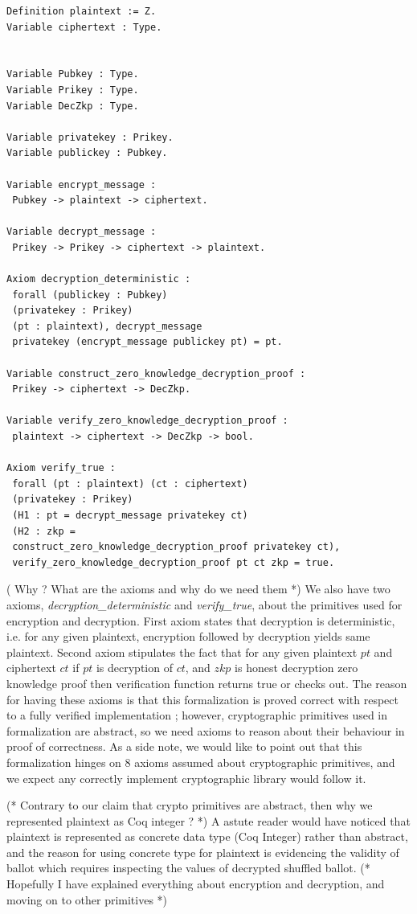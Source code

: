 \documentclass{llncs}
\begin{document}
\begin{lstlisting}[frame=single,basicstyle=\ttfamily\footnotesize]
Definition plaintext := Z.
Variable ciphertext : Type. 


Variable Pubkey : Type.
Variable Prikey : Type.
Variable DecZkp : Type.

Variable privatekey : Prikey.
Variable publickey : Pubkey.

Variable encrypt_message :
 Pubkey -> plaintext -> ciphertext.

Variable decrypt_message :
 Prikey -> Prikey -> ciphertext -> plaintext.

Axiom decryption_deterministic :
 forall (publickey : Pubkey) 
 (privatekey : Prikey) 
 (pt : plaintext), decrypt_message 
 privatekey (encrypt_message publickey pt) = pt.
 
Variable construct_zero_knowledge_decryption_proof :
 Prikey -> ciphertext -> DecZkp.

Variable verify_zero_knowledge_decryption_proof :
 plaintext -> ciphertext -> DecZkp -> bool.

Axiom verify_true :
 forall (pt : plaintext) (ct : ciphertext) 
 (privatekey : Prikey)
 (H1 : pt = decrypt_message privatekey ct)
 (H2 : zkp = 
 construct_zero_knowledge_decryption_proof privatekey ct),
 verify_zero_knowledge_decryption_proof pt ct zkp = true.
\end{lstlisting}

( Why ? What are the axioms and why do we need them  *)
We also have two axioms,  \textit{decryption\_deterministic} and 
\textit{verify\_true}, about the primitives used for encryption and 
decryption. First axiom states that decryption is deterministic, i.e.
for any given plaintext, encryption followed by decryption yields same 
plaintext. Second axiom stipulates the fact that for any given plaintext 
$pt$ and ciphertext $ct$ if $pt$ is decryption of $ct$, and $zkp$ is 
honest decryption zero knowledge proof then verification function 
returns true or checks out. The reason for having these axioms is that this 
formalization is proved correct with 
respect to a fully verified implementation \cite{Pattinson:2017:SVE}; 
however, cryptographic primitives used in formalization  
are abstract, so we need axioms 
to reason about their behaviour in proof 
of correctness. As a side note, we would like to point out that
 this formalization hinges on 8 axioms assumed about cryptographic 
 primitives, and we expect any correctly implement cryptographic library 
 would follow it.

(* Contrary to our claim that crypto primitives are abstract, then 
why we represented plaintext as Coq integer ? *)
A astute reader would have noticed that plaintext is represented as 
concrete data type (Coq Integer) rather than abstract, and 
the reason for using concrete type for plaintext is evidencing the
validity of ballot which requires inspecting the values of 
decrypted shuffled ballot.
(* Hopefully I have explained everything about encryption and 
   decryption, and moving on to other primitives *)
\end{document}
